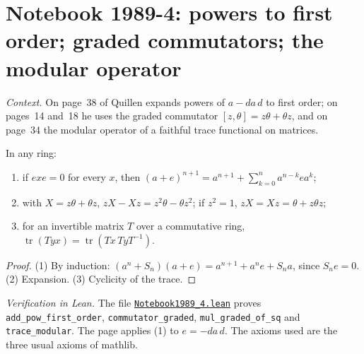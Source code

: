 \section[Notebook 1989-4: powers to first order]{Notebook 1989-4: powers to first order; graded commutators; the modular operator\protect{}}\label{sec:quillen-1989-4}

\emph{Context.} On page~38 of  Quillen expands powers of $a - da\,d$ to first order; on pages~14 and~18 he uses the graded commutator $[z, \theta] = z\theta + \theta z$, and on page~34 the modular operator of a faithful trace functional on matrices.

\begin{encadre}
\begin{theoreme}\label{thm:quillen-1989-4}
In any ring:
\begin{enumerate}
\item if $exe = 0$ for every $x$, then $(a + e)^{n+1} = a^{n+1} + \sum_{k=0}^na^{n-k}ea^k$;
\item with $X = z\theta + \theta z$, $zX - Xz = z^2\theta - \theta z^2$; if $z^2 = 1$, $zX = Xz = \theta + z\theta z$;
\item for an invertible matrix $T$ over a commutative ring, $\operatorname{tr}(Tyx) = \operatorname{tr}(Tx\,TyT^{-1})$.
\end{enumerate}
\end{theoreme}
\end{encadre}

\begin{proof}
(1) By induction: $(a^n + S_n)(a + e) = a^{n+1} + a^ne + S_na$, since $S_ne = 0$. (2) Expansion. (3) Cyclicity of the trace.
\end{proof}

\emph{Verification in Lean.} The file \href{\leanblobmain/Notebook1989_4.lean}{\texttt{Notebook1989\_4.\allowbreak{}lean}} proves \texttt{add\_pow\_first\_order}, \texttt{commutator\_graded}, \texttt{mul\_graded\_of\_sq} and \texttt{trace\_modular}. The page applies (1) to $e = -da\,d$. The axioms used are the three usual axioms of mathlib.

